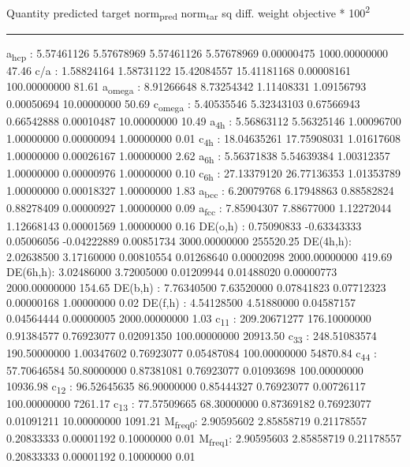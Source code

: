 \documentclass[11pt]{article}
\begin{document}
Quantity      predicted    target     norm\textsubscript{pred}   norm\textsubscript{tar}    sq diff.      weight    objective * 100\textsuperscript{2} 

\noindent\rule{\textwidth}{0.5pt}
a\textsubscript{hcp}   :   5.57461126   5.57678969   5.57461126   5.57678969   0.00000475 1000.00000000        47.46
c/a     :   1.58824164   1.58731122  15.42084557  15.41181168   0.00008161 100.00000000        81.61
a\textsubscript{omega} :   8.91266648   8.73254342   1.11408331   1.09156793   0.00050694  10.00000000        50.69
c\textsubscript{omega} :   5.40535546   5.32343103   0.67566943   0.66542888   0.00010487  10.00000000        10.49
a\textsubscript{4h}    :   5.56863112   5.56325146   1.00096700   1.00000000   0.00000094   1.00000000         0.01
c\textsubscript{4h}    :  18.04635261  17.75908031   1.01617608   1.00000000   0.00026167   1.00000000         2.62
a\textsubscript{6h}    :   5.56371838   5.54639384   1.00312357   1.00000000   0.00000976   1.00000000         0.10
c\textsubscript{6h}    :  27.13379120  26.77136353   1.01353789   1.00000000   0.00018327   1.00000000         1.83
a\textsubscript{bcc}   :   6.20079768   6.17948863   0.88582824   0.88278409   0.00000927   1.00000000         0.09
a\textsubscript{fcc}   :   7.85904307   7.88677000   1.12272044   1.12668143   0.00001569   1.00000000         0.16
DE(o,h) :   0.75090833  -0.63343333   0.05006056  -0.04222889   0.00851734 3000.00000000    255520.25
DE(4h,h):   2.02638500   3.17160000   0.00810554   0.01268640   0.00002098 2000.00000000       419.69
DE(6h,h):   3.02486000   3.72005000   0.01209944   0.01488020   0.00000773 2000.00000000       154.65
DE(b,h) :   7.76340500   7.63520000   0.07841823   0.07712323   0.00000168   1.00000000         0.02
DE(f,h) :   4.54128500   4.51880000   0.04587157   0.04564444   0.00000005 2000.00000000         1.03
c\textsubscript{11}    : 209.20671277 176.10000000   0.91384577   0.76923077   0.02091350 100.00000000     20913.50
c\textsubscript{33}    : 248.51083574 190.50000000   1.00347602   0.76923077   0.05487084 100.00000000     54870.84
c\textsubscript{44}    :  57.70646584  50.80000000   0.87381081   0.76923077   0.01093698 100.00000000     10936.98
c\textsubscript{12}    :  96.52645635  86.90000000   0.85444327   0.76923077   0.00726117 100.00000000      7261.17
c\textsubscript{13}    :  77.57509665  68.30000000   0.87369182   0.76923077   0.01091211  10.00000000      1091.21
M\textsubscript{freq}\textsubscript{0}:   2.90595602   2.85858719   0.21178557   0.20833333   0.00001192   0.10000000         0.01
M\textsubscript{freq}\textsubscript{1}:   2.90595603   2.85858719   0.21178557   0.20833333   0.00001192   0.10000000         0.01
\end{document}
